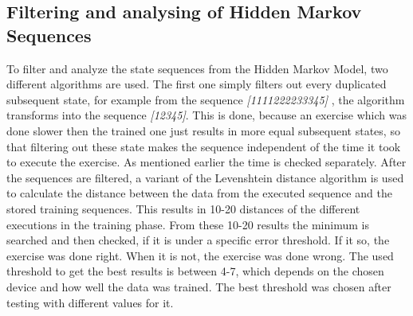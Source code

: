 \subsection{Filtering and analysing of Hidden Markov Sequences}
To filter and analyze the state sequences from the Hidden Markov Model, two different algorithms are used. The first one simply filters out every duplicated subsequent state, for example from the sequence \textit{\small[1111222233345]} , the algorithm transforms into the sequence \textit{\small[12345]}. This is done, because an exercise which was done slower then the trained one just results in more equal subsequent states, so that filtering out these state makes the sequence independent of the time it took to execute the exercise. As mentioned earlier the time is checked separately. %
\newline
\newline
After the sequences are filtered, a variant of the Levenshtein distance algorithm is used to calculate the distance between the data from the executed sequence and the stored training sequences. This results in 10-20 distances of the different executions in the training phase. From these 10-20 results the minimum is searched and then checked, if it is under a specific error threshold. If it so, the exercise was done right. When it is not, the exercise was done wrong. The used threshold to get the best results is between 4-7, which depends on the chosen device and how well the data was trained. The best threshold was chosen after testing with different values for it.